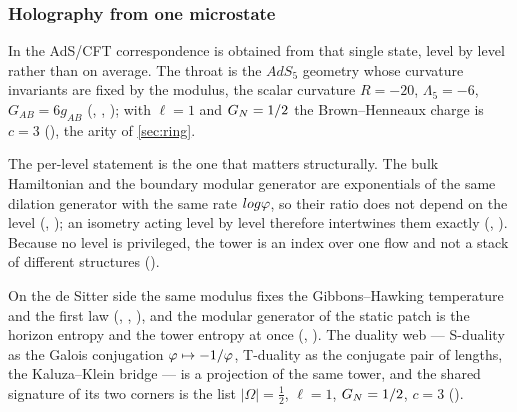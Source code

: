 \subsubsection{Holography from one microstate}\label{sec:adscft}

In \cite[\S3.4]{gonzalez26cw} the AdS/CFT correspondence is obtained from that
single state, level by level rather than on average.  The throat is the $AdS_5$
geometry whose curvature invariants are fixed by the modulus, the scalar curvature $R=-20$,
$\Lambda_5=-6$, $G_{AB}=6g_{AB}$  (,
, ); with $\ell=1$ and
$G_{N}=1/2$ the Brown--Henneaux charge is $c=3$
(), the arity of
\cref{sec:ring}.

The per-level statement is the one that matters structurally.  The bulk
Hamiltonian and the boundary modular generator are exponentials of the same
dilation generator with the same rate $log\varphi$, so their ratio does not
depend on the level  (,
); an isometry acting
level by level therefore intertwines them exactly
(,
).  Because no level is privileged,
the tower is an index over one flow and not a stack of different structures
 ().

On the de Sitter side the same modulus fixes the Gibbons--Hawking temperature and
the first law  (,
, ),
and the modular generator of the static patch is the horizon entropy and
the tower entropy at once  (,
).  The duality web --- S-duality
as the Galois conjugation $\varphi\mapsto-1/\varphi$, T-duality as the conjugate
pair of lengths, the Kaluza--Klein bridge --- is a projection of the same tower,
and the shared signature of its two corners is the list
$|\Omega|=\tfrac12$, $\ell=1$, $G_{N}=1/2$, $c=3$
().

